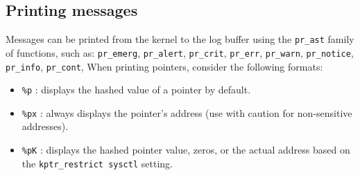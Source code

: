 \subsection{Printing messages}
Messages can be printed from the kernel to the log buffer using the \texttt{pr\_ast} family of functions, such as: \texttt{pr\_emerg}, \texttt{pr\_alert}, \texttt{pr\_crit}, \texttt{pr\_err}, \texttt{pr\_warn}, \texttt{pr\_notice}, \texttt{pr\_info}, \texttt{pr\_cont},
When printing pointers, consider the following formats: 
\begin{itemize} 
    \item \texttt{\%p} : displays the hashed value of a pointer by default.
    \item \texttt{\%px} : always displays the pointer's address (use with caution for non-sensitive addresses). 
    \item \texttt{\%pK} : displays the hashed pointer value, zeros, or the actual address based on the \texttt{kptr\_restrict sysctl} setting. 
\end{itemize}